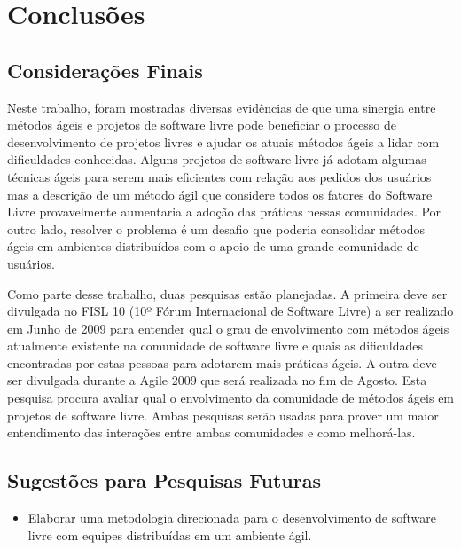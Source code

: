 \chapter{Conclusões}
\label{cap:conclusoes}

\section{Considerações Finais}

Neste trabalho, foram mostradas diversas evidências de que uma
sinergia entre métodos ágeis e projetos de software livre pode
beneficiar o processo de desenvolvimento de projetos livres e ajudar
os atuais métodos ágeis a lidar com dificuldades conhecidas. Alguns
projetos de software livre já adotam algumas técnicas ágeis para serem
mais eficientes com relação aos pedidos dos usuários mas a descrição
de um método ágil que considere todos os fatores do Software Livre
provavelmente aumentaria a adoção das práticas nessas comunidades. Por
outro lado, resolver o problema é um desafio que poderia consolidar
métodos ágeis em ambientes distribuídos com o apoio de uma grande
comunidade de usuários.

Como parte desse trabalho, duas pesquisas estão planejadas. A primeira
deve ser divulgada no FISL 10 (10º Fórum Internacional de Software
Livre) a ser realizado em Junho de 2009 para entender qual o grau de
envolvimento com métodos ágeis atualmente existente na comunidade de
software livre e quais as dificuldades encontradas por estas pessoas
para adotarem mais práticas ágeis. A outra deve ser divulgada durante
a Agile 2009 que será realizada no fim de Agosto. Esta pesquisa
procura avaliar qual o envolvimento da comunidade de métodos ágeis em
projetos de software livre. Ambas pesquisas serão usadas para prover
um maior entendimento das interações entre ambas comunidades e como
melhorá-las.


\section{Sugestões para Pesquisas Futuras} 

\begin{itemize}
	\item Elaborar uma metodologia direcionada para o
          desenvolvimento de software livre com equipes distribuídas
          em um ambiente ágil.
\end{itemize}
